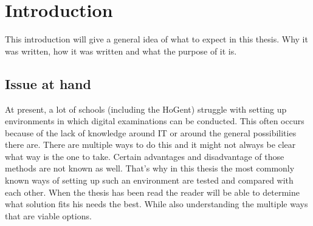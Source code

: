 
\chapter*{Introduction}
\label{ch:inleiding}

This introduction will give a general idea of what to expect in this thesis. Why it was written, how it was written and what the purpose of it is. 

\section{Issue at hand}
\label{sec:probleemstelling}

At present, a lot of schools (including the HoGent) struggle with setting up environments in which digital examinations can be conducted. This often occurs because of the lack of knowledge around IT or around the general possibilities there are. There are multiple ways to do this and it might not always be clear what way is the one to take. Certain advantages and disadvantage  of those methods are not known as well. That's why in this thesis the most commonly known ways of setting up such an environment are tested and compared with each other. When the thesis has been read the reader will be able to determine what solution fits his needs the best. While also understanding the multiple ways that are viable options. 

